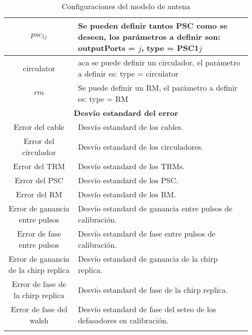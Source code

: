 \begin{center}
\begin{longtable}{|c|p{9cm}|}
	$psc_{1j}$ & Se pueden definir tantos PSC como se deseen, los parámetros a definir son: outputPorts = $j$, type = PSC1$j$ \tabularnewline \hline 
	circulator & aca se puede definir un circulador, el parámetro a definir es: type = circulator \tabularnewline \hline 
	$rm$ & Se puede definir un RM, el parámetro a definir es: type = RM \tabularnewline \hline 
	\multicolumn{2}{|c|}{\textbf{Desvío estandard del error}} \\
	\hline
	Error del cable & Desvío estandard de los cables. \tabularnewline \hline 
	Error del circulador & Desvío estandard de los circuladores. \tabularnewline \hline 
	Error del TRM & Desvío estandard de los TRMs. \tabularnewline \hline 
	Error del PSC & Desvío estandard de los PSC. \tabularnewline \hline 
	Error del RM & Desvío estandard de los RM. \tabularnewline \hline 
	Error de ganancia entre pulsos & Desvío estandard de ganancia entre pulsos de calibración. \tabularnewline \hline 
	Error de fase entre pulsos & Desvío estandard de fase entre pulsos de calibración. \tabularnewline \hline 
	Error de ganancia de la chirp replica & Desvío estandard de ganancia de la chirp replica. \tabularnewline \hline 
	Error de fase de la chirp replica & Desvío estandard de fase de la chirp replica. \tabularnewline \hline 
	Error de fase del walsh & Desvío estandard de fase del seteo de los defasadores en calibración. \tabularnewline \hline 
	\caption{Configuraciones del modelo de antena}
  \end{longtable}
  \label{tab:conf_modelo_antena1}
\end{center}

